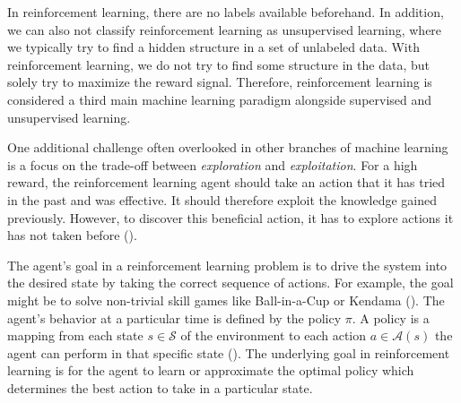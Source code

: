 In reinforcement learning, there are no labels available beforehand. In addition, we can also not classify reinforcement learning as unsupervised learning, where we typically try to find a hidden structure in a set of unlabeled data. With reinforcement learning, we do not try to find some structure in the data, but solely try to maximize the reward signal. Therefore, reinforcement learning is considered a third main machine learning paradigm alongside supervised and unsupervised learning.

One additional challenge often overlooked in other branches of machine learning is a focus on the trade-off between \textit{exploration} and \textit{exploitation}. For a high reward, the reinforcement learning agent should take an action that it has tried in the past and was effective. It should therefore exploit the knowledge gained previously. However, to discover this beneficial action, it has to explore actions it has not taken before (\cite{sutton2018reinforcement}).

The agent's goal in a reinforcement learning problem is to drive the system into the desired state by taking the correct sequence of actions. For example, the goal might be to solve non-trivial skill games like Ball-in-a-Cup or Kendama (\cite{kober2010imitation}). The agent's behavior at a particular time is defined by the policy $\pi$. A policy is a mapping from each state $s \in \mathcal{S}$ of the environment to each action $a \in \mathcal{A}(s)$ the agent can perform in that specific state (\cite{sutton2018reinforcement}). The underlying goal in reinforcement learning is for the agent to learn or approximate the optimal policy which determines the best action to take in a particular state.


